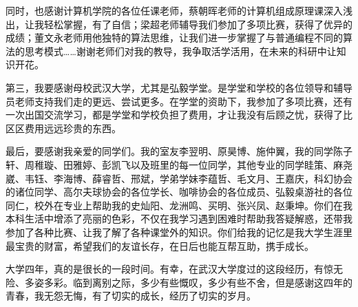同时，也感谢计算机学院的各位任课老师，蔡朝晖老师的计算机组成原理课深入浅出，让我轻松掌握，有了自信；梁超老师辅导我们参加了多项比赛，获得了优异的成绩；董文永老师用他独特的算法思维，让我们进一步掌握了与普通编程不同的算法的思考模式……谢谢老师们对我的教导，我争取活学活用，在未来的科研中让知识开花。

第三，我要感谢母校武汉大学，尤其是弘毅学堂。是学堂和学校的各位领导和辅导员老师支持我们走的更远、尝试更多。在学堂的资助下，我参加了多项比赛，还有一次出国交流学习，都是学堂和学校负担了费用，才让我没有后顾之忧，获得了比区区费用远远珍贵的东西。

最后，要感谢我亲爱的同学们。我的室友李翌明、原昊博、施仲翼，我的同学陈子轩、周稚璇、田雅婷、彭凯飞以及班里的每一位同学，其他专业的同学眭策、麻尧崴、韦钰、李海博、薛睿哲、邢斌，学弟学妹李蕴哲、毛文月、王嘉庆，科幻协会的诸位同学、高尔夫球协会的各位学长、咖啡协会的各位成员、弘毅桌游社的各位同仁，校外在专业上帮助我的史灿阳、龙洲鸣、买明、张兴凤、赵秉坤。你们在我本科生活中增添了亮丽的色彩，不仅在我学习遇到困难时帮助我答疑解惑，还带我参加了各种比赛、让我了解了各种课堂外的知识。你们给我的记忆是我大学生涯里最宝贵的财富，希望我们的友谊长存，在日后也能互帮互助，携手成长。

大学四年，真的是很长的一段时间。有幸，在武汉大学度过的这段经历，有惊无险、多姿多彩。临到离别之际，多少有些慨叹，多少有些不舍，但是感谢这四年的青春，我无怨无悔，有了切实的成长，经历了切实的岁月。

\vspace{2em}
